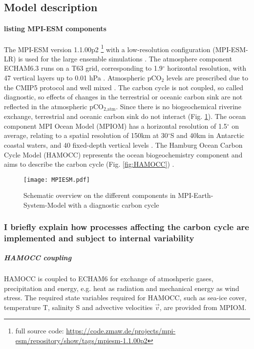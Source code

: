 \documentclass[12pt]{article}
\begin{document}
\subsection{Model description}

\paragraph{listing MPI-ESM components} The MPI-ESM version 1.1.00p2  \footnote[1]{full source code: \url{https://code.zmaw.de/projects/mpi-esm/repository/show/tags/mpiesm-1.1.00p2}} with a low-resolution configuration (MPI-ESM-LR) is used for the large ensemble simulations \citep{Giorgetta2013}. The atmosphere component ECHAM6.3 runs on a T63 grid, corresponding to 1.9$^\circ$ horizontal resolution, with 47 vertical layers up to 0.01 hPa \citep{Stevens2013}. 
Atmospheric pCO$_2$ levels are prescribed due to the CMIP5 protocol and well mixed \citep{Taylor2012}. The carbon cycle is not coupled, so called diagnostic, so effects of changes in the terrestrial or oceanic carbon sink are not reflected in the atmospheric pCO$_{\text{2,atm}}$. Since there is no biogeochemical riverine exchange, terrestrial and oceanic carbon sink do not interact (Fig. \ref{fig:MPIESM}). The ocean component MPI Ocean Model (MPIOM) has a horizontal resolution of 1.5$^\circ$ on average, relating to a spatial resolution of 150km at 30$^\circ$S and 40km in Antarctic coastal waters, and 40 fixed-depth vertical levels \citep{Jungclaus2013}. The Hamburg Ocean Carbon Cycle Model (HAMOCC) represents the ocean biogeochemistry component and aims to describe the carbon cycle (Fig. \ref{fig:HAMOCC}) \citep{Ilyina2013}.

\begin{figure}[h!]
	\centering 
	\texttt{[image: MPIESM.pdf]}
	\caption{Schematic overview on the different components in MPI-Earth-System-Model with a diagnostic carbon cycle \citep{Giorgetta2013}}
	\label{fig:MPIESM}
\end{figure}

\subsubsection*{I briefly explain how processes affecting the carbon cycle are implemented and subject to internal variability}
\subparagraph{HAMOCC coupling} 
HAMOCC is coupled to ECHAM6 for exchange of atmoshperic gases, precipitation and energy, e.g. heat as radiation and mechanical energy as wind stress. The required state variables required for HAMOCC, such as sea-ice cover, temperature T, salinity S and advective velocities $\vec{v}$, are provided from MPIOM. 
\end{document}
